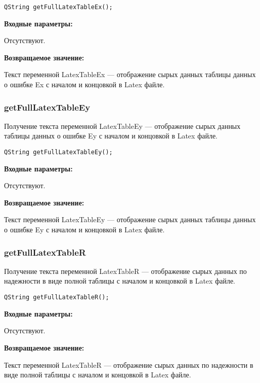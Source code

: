 \begin{lstlisting}[label=code_syntax_getFullLatexTableEx,caption=Синтаксис]
QString getFullLatexTableEx();
\end{lstlisting}

\textbf{Входные параметры:}

Отсутствуют.

\textbf{Возвращаемое значение:}

Текст переменной LatexTableEx --- отображение сырых данных таблицы данных о ошибке Ex с началом и концовкой в Latex файле.


\subsubsection{getFullLatexTableEy}\label{getFullLatexTableEy}

Получение текста переменной LatexTableEy --- отображение сырых данных таблицы данных о ошибке Ey с началом и концовкой в Latex файле.


\begin{lstlisting}[label=code_syntax_getFullLatexTableEy,caption=Синтаксис]
QString getFullLatexTableEy();
\end{lstlisting}

\textbf{Входные параметры:}

Отсутствуют.

\textbf{Возвращаемое значение:}

Текст переменной LatexTableEy --- отображение сырых данных таблицы данных о ошибке Ey с началом и концовкой в Latex файле.


\subsubsection{getFullLatexTableR}\label{getFullLatexTableR}

Получение текста переменной LatexTableR --- отображение сырых данных по надежности в виде полной таблицы с началом и концовкой в Latex файле.


\begin{lstlisting}[label=code_syntax_getFullLatexTableR,caption=Синтаксис]
QString getFullLatexTableR();
\end{lstlisting}

\textbf{Входные параметры:}

Отсутствуют.

\textbf{Возвращаемое значение:}

Текст переменной LatexTableR --- отображение сырых данных по надежности в виде полной таблицы с началом и концовкой в Latex файле.


